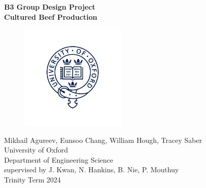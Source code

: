 
\vspace*{2cm}
\begin{center}
\huge{\textbf{B3 Group Design Project}}\\
\huge{\textbf{Cultured Beef Production}}\\
\begin{figure}[h]
    \centering
    \includegraphics[width=0.45\textwidth]{y0-oxford.jpg}
    \hfill
\end{figure}
\vspace*{-1cm}
{\Large Mikhail Agureev, Eunsoo Chang, William Hough, Tracey Saber}\\ %
{\Large University of Oxford}\\ %
\vspace*{1cm}
{\large Department of Engineering Science}\\ %
{\large supervised by J. Kwan, N. Hankins, B. Nie, P. Mouthuy}\\[0.5cm] %
\vspace*{0.5cm}
{\large Trinity Term 2024}

\thispagestyle{empty} %
\end{center}